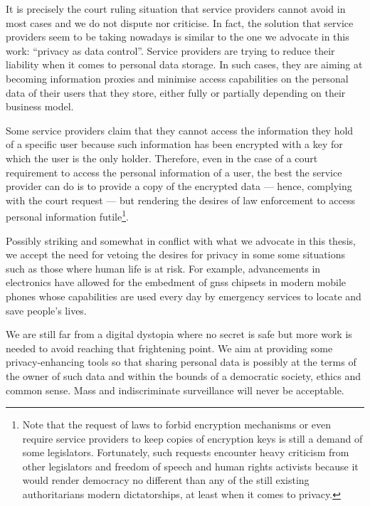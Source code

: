 It is precisely the court ruling situation that service providers cannot avoid in 
most cases and we do not dispute nor criticise. In fact, the solution that service 
providers seem to be taking nowadays is similar to the one we advocate in this 
work: ``privacy as data control''. Service providers are trying to reduce their 
liability when it comes to personal data storage. In such cases, they are aiming  
at becoming information proxies and minimise access capabilities on the personal 
data of their users that they store, either fully or partially depending on their 
business model.

Some service providers claim that they cannot access the information they hold of 
a specific user because such information has been encrypted with a key for which 
the user is the only holder. Therefore, even in the case of a court requirement 
to access the personal information of a user, the best the service provider can 
do is to provide a copy of the encrypted data --- hence, complying with the court request 
--- but rendering the desires of law enforcement to access personal information 
futile\footnote{Note that the request of laws to forbid encryption mechanisms or even require 
service providers to keep copies of encryption keys is still a demand of some legislators. 
Fortunately, such requests encounter heavy criticism from other legislators and 
freedom of speech and human rights activists because it would render democracy no 
different than any of the still existing authoritarians modern dictatorships, at 
least when it comes to privacy.}. 

Possibly striking and somewhat in conflict with what we advocate in this thesis, 
we accept the need for vetoing the desires for privacy in some some situations such 
as those where human life is at risk. For example, advancements in electronics have 
allowed for the embedment of \ac{gnss} chipsets in modern mobile phones whose capabilities 
are used every day by emergency services to locate and save people's lives.

We are still far from a digital dystopia where no secret is safe but more work is 
needed to avoid reaching that frightening point. We aim at providing some privacy-enhancing
tools so that sharing personal data is possibly at the terms of the owner of such 
data and within the bounds of a democratic society, ethics and common sense. Mass 
and indiscriminate surveillance will never be acceptable.

